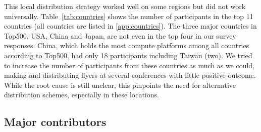 \documentclass[preprint,5p,times]{elsarticle}
\def\Mcountries{Major contributors\xspace{}}%
\begin{document}
This local distribution strategy worked well on some regions but
did not work universally. Table~\ref{tab:countries} shows the number
of participants in the top 11 countries (all countries are listed in
\ref{app:countries}).
The three major countries in Top500, USA, China and Japan, are not even in
the top four in our survey responses. China, which holds the most
compute platforms among all countries according to Top500, had only 18 participants including
Taiwan (two). We tried to increase the number of participants from these
countries as much as we could, making and distributing flyers at
several conferences with little positive outcome. While the root cause is still unclear, this pinpoints the need for alternative distribution schemes, especially in these locations.

\subsection*{\Mcountries}
\end{document}
